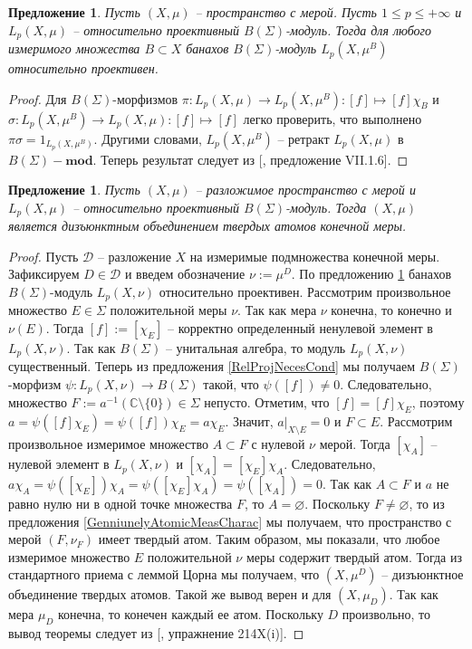 \documentclass[12pt]{article}
\newtheorem{proposition}[theorem]{Предложение}
\begin{document}
\begin{proposition}\label{BSigmaModLpRetrProj} Пусть $(X,\mu)$ -- пространство с мерой. Пусть $1\leq p\leq +\infty$ и $L_p(X,\mu)$ -- относительно проективный $B(\Sigma)$-модуль. Тогда для любого измеримого множества $B\subset X$ банахов $B(\Sigma)$-модуль $L_p(X,\mu^B)$ относительно проективен.
\end{proposition}
\begin{proof} Для $B(\Sigma)$-морфизмов $\pi:L_p(X,\mu)\to L_p(X,\mu^B):[f]\mapsto [f]\chi_B$ и $\sigma:L_p(X,\mu^B)\to L_p(X,\mu):[f]\mapsto [f]$ легко проверить, что выполнено $\pi\sigma=1_{L_p(X,\mu^B)}$. Другими словами, $L_p(X,\mu^B)$ -- ретракт $L_p(X,\mu)$ в $B(\Sigma)-\mathbf{mod}$. Теперь результат следует из  [\cite{HelBanLocConvAlg}, предложение VII.1.6].
\end{proof}

\begin{proposition}\label{LpBSigmaModNecessCond} Пусть $(X,\mu)$ -- разложимое пространство с мерой и $L_p(X,\mu)$ -- относительно проективный $B(\Sigma)$-модуль. Тогда $(X,\mu)$ является дизъюнктным объединением твердых атомов конечной меры.
\end{proposition}
\begin{proof} Пусть $\mathcal{D}$ -- разложение $X$ на измеримые подмножества конечной меры. Зафиксируем $D\in\mathcal{D}$ и введем обозначение $\nu:=\mu^D$. По предложению \ref{BSigmaModLpRetrProj} банахов $B(\Sigma)$-модуль $L_p(X,\nu)$ относительно проективен. Рассмотрим произвольное множество $E\in\Sigma$ положительной меры $\nu$. Так как мера $\nu$ конечна, то конечно и $\nu(E)$. Тогда $[f]:=[\chi_E]$ -- корректно определенный ненулевой элемент в $L_p(X,\nu)$. Так как $B(\Sigma)$ -- унитальная алгебра, то модуль $L_p(X,\nu)$ существенный. Теперь из предложения \ref{RelProjNecesCond} мы получаем $B(\Sigma)$-морфизм $\psi:L_p(X,\nu)\to B(\Sigma)$ такой, что $\psi([f])\neq 0$. Следовательно, множество $F:=a^{-1}(\mathbb{C}\setminus\{0\})\in\Sigma$ непусто. Отметим, что $[f]=[f]\chi_E$, поэтому $a=\psi([f]\chi_E)=\psi([f])\chi_E=a\chi_E$. Значит, $a|_{X\setminus E}=0$ и $F\subset E$. Рассмотрим произвольное измеримое множество $A\subset F$ с нулевой $\nu$ мерой. Тогда $[\chi_A]$ -- нулевой элемент в  $L_p(X,\nu)$ и $[\chi_A]=[\chi_E]\chi_A$. Следовательно, $a\chi_A=\psi([\chi_E])\chi_A=\psi([\chi_E]\chi_A)=\psi([\chi_A])=0$. Так как $A\subset F$ и $a$ не равно нулю ни в одной точке множества $F$, то $A=\varnothing$. Поскольку $F\neq \varnothing$, то из предложения \ref{GenniunelyAtomicMeasCharac} мы получаем, что пространство с мерой $(F,\nu_F)$ имеет твердый атом. Таким образом, мы показали, что любое измеримое множество $E$ положительной $\nu$ меры содержит твердый атом. Тогда из стандартного приема с леммой Цорна мы получаем, что $(X,\mu^D)$ --  дизъюнктное объединение твердых атомов. Такой же вывод верен и для $(X,\mu_D)$. Так как мера $\mu_D$ конечна, то конечен каждый ее атом. Поскольку $D$ произвольно, то вывод теоремы следует из [\cite{FremMeasTh2}, упражнение 214X(i)].
\end{proof}
\end{document}

